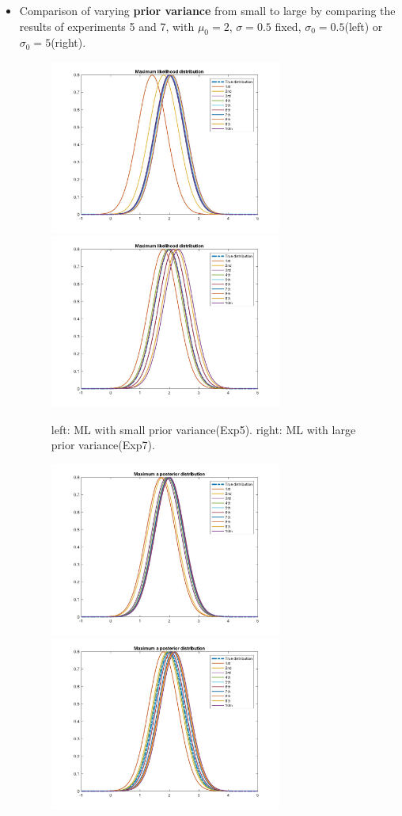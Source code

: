 \documentclass[a4paper]{article}
\begin{document}
\begin{spacing}{2.0}
\begin{itemize}
\newpage
\item
Comparison of varying \textbf{prior variance} from small to large by comparing the results of experiments 5 and 7, with $\mu_0 = 2$, $\sigma= 0.5$ fixed, $\sigma_0 = 0.5$(left) or $\sigma_0 = 5$(right).
\begin{figure}[H]
	\centering
	\includegraphics[width=3in]{ML5.jpg}
	\includegraphics[width=3in]{ML7.jpg}
	\caption{left: ML with small prior variance(Exp5). right: ML with large prior variance(Exp7).}
	\label{q}
\end{figure}
\begin{figure}[H]
	\centering
	\includegraphics[width=3in]{MAP5.jpg}
	\includegraphics[width=3in]{MAP7.jpg}

\end{figure}
\end{itemize}
\end{spacing}
\end{document}
